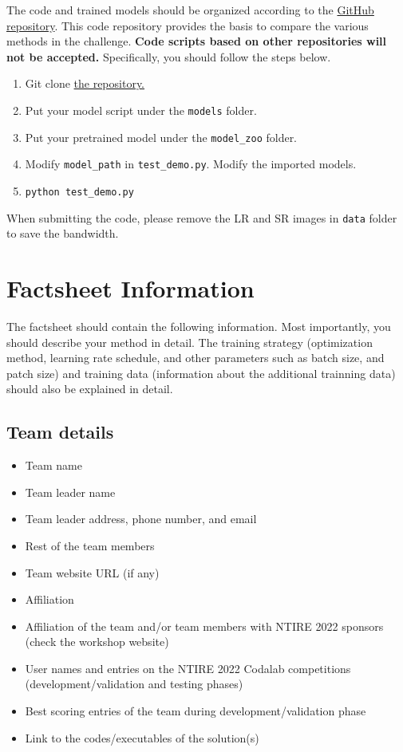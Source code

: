 \documentclass[10pt,twocolumn,letterpaper]{article}
\begin{document}
The code and trained models should be organized according to the \href{https://github.com/ofsoundof/IMDN}{GitHub repository}. This code repository provides the basis to compare the various methods in the challenge. \textbf{Code scripts based on other repositories will not be accepted.} Specifically, you should follow the steps below.
\begin{enumerate}
    \item Git clone \href{https://github.com/ofsoundof/IMDN}{the repository.}
    \item Put your model script under the \texttt{models} folder.
    \item Put your pretrained model under the \texttt{model\_zoo} folder.
    \item Modify \texttt{model\_path} in \texttt{test\_demo.py}. Modify the imported models.
    \item \texttt{python test\_demo.py}
\end{enumerate}
When submitting the code, please remove the LR and SR images in \texttt{data} folder to save the bandwidth.

\section{Factsheet Information}

The factsheet should contain the following information. Most importantly, you should describe your method in detail. The training strategy (optimization method, learning rate schedule, and other parameters such as batch size, and patch size) and training data (information about the additional trainning data) should also be explained in detail.

\subsection{Team details}

\begin{itemize}
\item Team name                                  
\item Team leader name                           
\item Team leader address, phone number, and email 
\item Rest of the team members        
\item Team website URL (if any)                   
\item Affiliation
\item Affiliation of the team and/or team members with NTIRE 2022 sponsors (check the workshop website)
\item User names and entries on the NTIRE 2022 Codalab competitions (development/validation and testing phases)
\item Best scoring entries of the team during development/validation phase
\item Link to the codes/executables of the solution(s)
\end{itemize}
\end{document}
